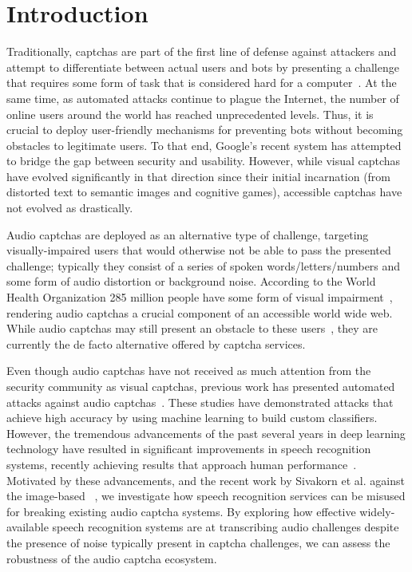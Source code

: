 \section{Introduction}
\label{sec:intro}

Traditionally, captchas are part of the first line of defense against attackers 
and attempt to differentiate between actual users and bots by presenting a challenge 
that requires some form of task that is considered hard for a computer~\cite{captcha}.
At the same time, as automated attacks continue to plague the Internet,
the number of online users around the world has reached unprecedented levels.
Thus, it is crucial to deploy user-friendly mechanisms for preventing bots without
becoming obstacles to legitimate users. To that end, Google's recent \re system
has attempted to bridge the gap between security and usability. %
However, while visual captchas have evolved significantly in that direction
since their initial incarnation (from distorted text to semantic images and cognitive games),
accessible captchas have not evolved as drastically.

Audio captchas are deployed as an alternative type of challenge, targeting
visually-impaired users that would otherwise not be able to pass the presented
challenge; typically they consist of a series of spoken words/letters/numbers 
and some form of audio distortion or background noise.
According to the World Health Organization 285 million people have 
some form of visual impairment~\cite{impaired}, rendering audio captchas a
crucial component of an accessible world wide web. While audio captchas may still present
an obstacle to these users~\cite{sauer2008towards,bigham2008inspiring,bigham2009evaluating},
they are currently the de facto alternative offered by captcha services.

Even though audio captchas have not received as much attention from the security community as visual captchas,
previous work has presented automated attacks against audio captchas~\cite{Sano2013,Bursztein2009,
meutzner2014using,tam2009breaking,bursztein2011failure}. These studies have demonstrated attacks
that achieve high accuracy by using machine learning to build custom classifiers.
However, the tremendous advancements of the past several years in deep learning technology have
resulted in significant improvements in speech recognition systems, recently achieving
results that approach human performance~\cite{ibm_blog,saon2017english}. Motivated
by these advancements, and the recent work by Sivakorn et al. against the image-based
\re~\cite{sivakorn:eurosp16}, we investigate how speech recognition services
can be misused for breaking existing audio captcha systems. By exploring how effective
widely-available speech recognition systems are at transcribing audio challenges despite 
the presence of noise typically present in captcha challenges, we can assess the robustness 
of the audio captcha ecosystem.

